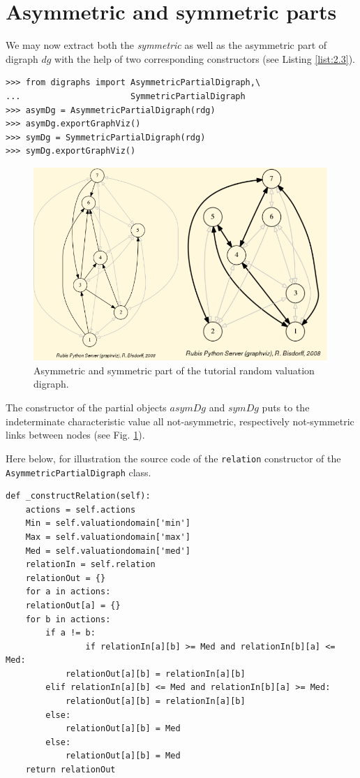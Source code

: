 \section{Asymmetric and symmetric parts}
\label{sec:2.3}

We may now extract both the \emph{}\emph{symmetric} as well as the asymmetric part of digraph $dg$ with the help of two corresponding constructors (see Listing \ref{list:2.3}).
\begin{lstlisting}[caption={Computing asymmetric and symmetric Parts},label=list:2.3]
>>> from digraphs import AsymmetricPartialDigraph,\
...                      SymmetricPartialDigraph
>>> asymDg = AsymmetricPartialDigraph(rdg)
>>> asymDg.exportGraphViz()
>>> symDg = SymmetricPartialDigraph(rdg)
>>> symDg.exportGraphViz()
\end{lstlisting}
\begin{figure}[h]
\includegraphics[width=12cm]{Figures/asymSymParts.png}
\caption{Asymmetric and symmetric part of the tutorial random valuation digraph.}
\label{fig:2.2}       %
\end{figure}
The constructor of the partial objects $asymDg$ and $symDg$ puts to the indeterminate characteristic value all not-asymmetric, respectively not-symmetric links between nodes (see Fig. \ref{fig:2.2}).

Here below, for illustration the source code of the {\tt relation} constructor of the {\tt AsymmetricPartialDigraph} class.
\begin{lstlisting}[caption={Computing the asymmetric part of a bipolar-valued relation},label=list:2.4,basicstyle=\ttfamily\scriptsize]
def _constructRelation(self):
    actions = self.actions
    Min = self.valuationdomain['min']
    Max = self.valuationdomain['max']
    Med = self.valuationdomain['med']
    relationIn = self.relation
    relationOut = {}
    for a in actions:
	relationOut[a] = {}
	for b in actions:
	    if a != b:
                if relationIn[a][b] >= Med and relationIn[b][a] <= Med:
		    relationOut[a][b] = relationIn[a][b]
		elif relationIn[a][b] <= Med and relationIn[b][a] >= Med:
		    relationOut[a][b] = relationIn[a][b]
		else:
		    relationOut[a][b] = Med
		else:
		    relationOut[a][b] = Med
    return relationOut
\end{lstlisting}


